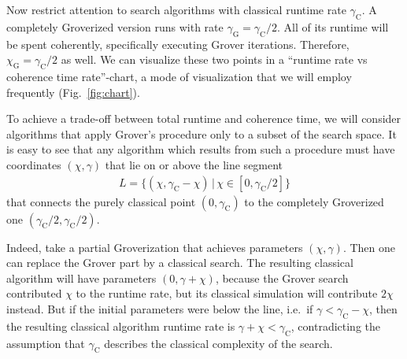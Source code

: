 \documentclass[a4paper,aps,floatfix]{revtex4}
\begin{document}
Now restrict attention to search algorithms with classical runtime rate $\gamma_{\mathrm{C}}$.
A completely Groverized version runs with rate 
$\gamma_{\mathrm{G}}=\gamma_{\mathrm{C}}/2$.
All of its runtime will be spent coherently, specifically executing Grover iterations.
Therefore, 
$\chi_{\mathrm{G}}=\gamma_{\mathrm{C}}/2$
as well.
We can visualize these two points in a ``runtime rate vs coherence time rate''-chart, a mode of visualization that we will employ frequently (Fig.~\ref{fig:chart}).

To achieve a trade-off between total runtime and coherence time, we will consider algorithms that apply Grover's procedure only to a subset of the search space.
It is easy to see that any algorithm which results from such a procedure must have coordinates $(\chi,\gamma)$ that lie on or above the line segment
\begin{align*}
	L=\big\{ (\chi, \gamma_{\mathrm{C}} - \chi) \,|\, \chi\in[0,\gamma_{\mathrm{C}}/2] \big\}
\end{align*}
that connects the purely classical point $(0,\gamma_{\mathrm{C}})$ to the completely Groverized one 
$( \gamma_{\mathrm{C}}/2, \gamma_{\mathrm{C}}/2)$.

Indeed, take a partial Groverization that achieves parameters $(\chi,\gamma)$.
Then one can replace the Grover part by a classical search.
The resulting classical algorithm will have parameters $(0,\gamma+\chi)$, because the Grover search contributed $\chi$ to the runtime rate, but its classical simulation will contribute $2\chi$ instead.
 But if the initial parameters were below the line, i.e.\ if $\gamma < \gamma_{\mathrm{C}} - \chi$, then the resulting classical algorithm runtime rate is
$\gamma + \chi < \gamma_{\mathrm{C}}$, 
contradicting the assumption that $\gamma_{\mathrm{C}}$ describes the classical complexity of the search.
\end{document}
